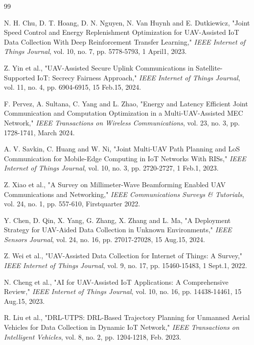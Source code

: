 \documentclass[journal]{IEEEtran}
\begin{document}
\begin{thebibliography}{99}
	
     N. H. Chu, D. T. Hoang, D. N. Nguyen, N. Van Huynh and E. Dutkiewicz, "Joint Speed Control and Energy Replenishment Optimization for UAV-Assisted IoT Data Collection With Deep Reinforcement Transfer Learning," \textit{IEEE Internet of Things Journal}, vol. 10, no. 7, pp. 5778-5793, 1 April1, 2023. 
        
     Z. Yin et al., "UAV-Assisted Secure Uplink Communications in Satellite-Supported IoT: Secrecy Fairness Approach," \textit{IEEE Internet of Things Journal}, vol. 11, no. 4, pp. 6904-6915, 15 Feb.15, 2024. 
        
     F. Pervez, A. Sultana, C. Yang and L. Zhao, "Energy and Latency Efficient Joint Communication and Computation Optimization in a Multi-UAV-Assisted MEC Network," \textit{IEEE Transactions on Wireless Communications}, vol. 23, no. 3, pp. 1728-1741, March 2024. 
        
     A. V. Savkin, C. Huang and W. Ni, "Joint Multi-UAV Path Planning and LoS Communication for Mobile-Edge Computing in IoT Networks With RISs," \textit{IEEE Internet of Things Journal}, vol. 10, no. 3, pp. 2720-2727, 1 Feb.1, 2023. 
        
     Z. Xiao et al., "A Survey on Millimeter-Wave Beamforming Enabled UAV Communications and Networking," \textit{IEEE Communications Surveys \& Tutorials}, vol. 24, no. 1, pp. 557-610, Firstquarter 2022.
        
     Y. Chen, D. Qin, X. Yang, G. Zhang, X. Zhang and L. Ma, "A Deployment Strategy for UAV-Aided Data Collection in Unknown Environments," \textit{IEEE Sensors Journal}, vol. 24, no. 16, pp. 27017-27028, 15 Aug.15, 2024.
        
     Z. Wei et al., "UAV-Assisted Data Collection for Internet of Things: A Survey," \textit{IEEE Internet of Things Journal}, vol. 9, no. 17, pp. 15460-15483, 1 Sept.1, 2022.
        
     N. Cheng et al., "AI for UAV-Assisted IoT Applications: A Comprehensive Review," \textit{IEEE Internet of Things Journal}, vol. 10, no. 16, pp. 14438-14461, 15 Aug.15, 2023.
    
     R. Liu et al., "DRL-UTPS: DRL-Based Trajectory Planning for Unmanned Aerial Vehicles for Data Collection in Dynamic IoT Network," \textit{IEEE Transactions on Intelligent Vehicles}, vol. 8, no. 2, pp. 1204-1218, Feb. 2023.
        

\end{thebibliography}
\end{document}
